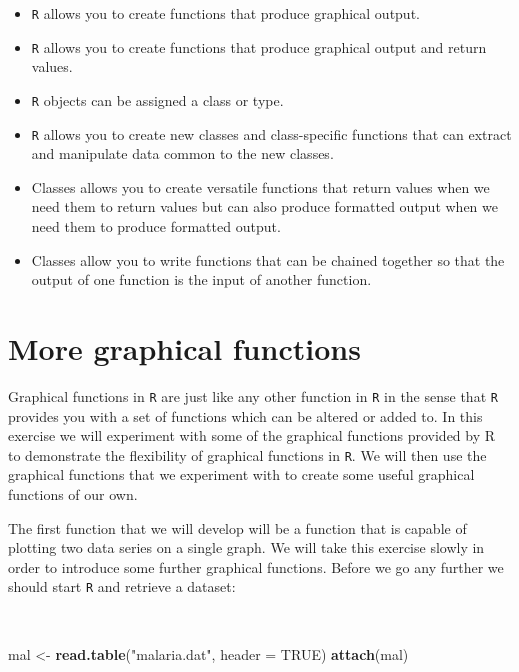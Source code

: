 \documentclass[12pt,a4paper]{book}
\newenvironment{Shaded}{\begin{snugshade}}{\end{snugshade}}
\newcommand{\DataTypeTok}[1]{\textcolor[rgb]{0.13,0.29,0.53}{#1}}
\newcommand{\KeywordTok}[1]{\textcolor[rgb]{0.13,0.29,0.53}{\textbf{#1}}}
\newcommand{\NormalTok}[1]{#1}
\newcommand{\OtherTok}[1]{\textcolor[rgb]{0.56,0.35,0.01}{#1}}
\newcommand{\StringTok}[1]{\textcolor[rgb]{0.31,0.60,0.02}{#1}}
\theoremstyle{definition}
\theoremstyle{definition}
\theoremstyle{definition}
\theoremstyle{remark}
\begin{document}
\begin{itemize}
\item
  \texttt{R} allows you to create functions that produce graphical
  output.
\item
  \texttt{R} allows you to create functions that produce graphical
  output and return values.
\item
  \texttt{R} objects can be assigned a class or type.
\item
  \texttt{R} allows you to create new classes and class-specific
  functions that can extract and manipulate data common to the new
  classes.
\item
  Classes allows you to create versatile functions that return values
  when we need them to return values but can also produce formatted
  output when we need them to produce formatted output.
\item
  Classes allow you to write functions that can be chained together so
  that the output of one function is the input of another function.
\end{itemize}

\hypertarget{exercise8}{%
\chapter{More graphical functions}\label{exercise8}}

Graphical functions in \texttt{R} are just like any other function in
\texttt{R} in the sense that \texttt{R} provides you with a set of
functions which can be altered or added to. In this exercise we will
experiment with some of the graphical functions provided by R to
demonstrate the flexibility of graphical functions in \texttt{R}. We
will then use the graphical functions that we experiment with to create
some useful graphical functions of our own.

The first function that we will develop will be a function that is
capable of plotting two data series on a single graph. We will take this
exercise slowly in order to introduce some further graphical functions.
Before we go any further we should start \texttt{R} and retrieve a
dataset:

~

\begin{Shaded}
\begin{Highlighting}[]
\NormalTok{mal <-}\StringTok{ }\KeywordTok{read.table}\NormalTok{(}\StringTok{"malaria.dat"}\NormalTok{, }\DataTypeTok{header =} \OtherTok{TRUE}\NormalTok{)}
\KeywordTok{attach}\NormalTok{(mal)}
\end{Highlighting}
\end{Shaded}
\end{document}
